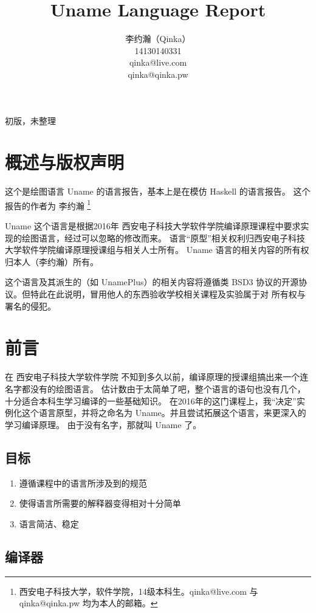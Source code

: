 \documentclass{ctexart}
\author{李约瀚（Qinka） \\ 14130140331 \\ qinka@live.com \\ qinka@qinka.pw}
\title{Uname Language Report}
\begin{document}
\maketitle

初版，未整理
\section{概述与版权声明}
\label{sec:copyright}

这个是绘图语言 Uname 的语言报告，基本上是在模仿 Haskell 的语言报告。
这个报告的作者为 李约瀚 \footnote{西安电子科技大学，软件学院，14级本科生。qinka@live.com 与 qinka@qinka.pw 均为本人的邮箱。}

Uname 这个语言是根据2016年 西安电子科技大学软件学院编译原理课程中要求实现的绘图语言，经过可以忽略的修改而来。
语言“原型”相关权利归西安电子科技大学软件学院编译原理授课组与相关人士所有。 Uname 语言的相关内容的所有权归本人（李约瀚）所有。

这个语言及其派生的（如 UnamePlus）的相关内容将遵循类 BSD3 协议的开源协议。但特此在此说明，冒用他人的东西验收学校相关课程及实验属于对
所有权与署名的侵犯。

\section{前言}
\label{sec:preface}

在 西安电子科技大学软件学院 不知到多久以前，编译原理的授课组搞出来一个连名字都没有的绘图语言。
估计数由于太简单了吧，整个语言的语句也没有几个，十分适合本科生学习编译的一些基础知识。
在2016年的这门课程上，我“决定”实例化这个语言原型，并将之命名为 Uname。并且尝试拓展这个语言，来更深入的学习编译原理。
由于没有名字，那就叫 Uname 了。

\subsection{目标}
\label{sec:preface:goals}

\begin{enumerate}
\item 遵循课程中的语言所涉及到的规范
\item 使得语言所需要的解释器变得相对十分简单
\item 语言简洁、稳定
\end{enumerate}

\subsection{编译器}
\label{sec:preface:compiler}
\end{document}
